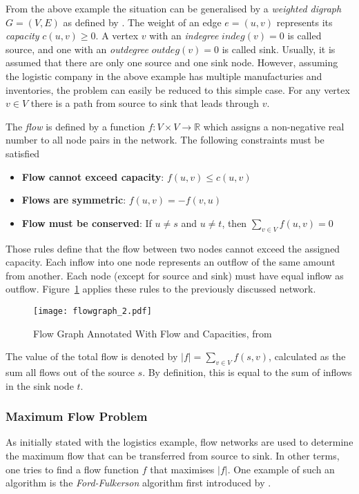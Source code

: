 \documentclass[final]{fhnwreport}       %
\begin{document}
From the above example the situation can be generalised by a \emph{weighted digraph} $G=(V,E)$ as defined by \cite{brossard_graph_2010}. The weight of an edge $e=(u,v)$ represents its \emph{capacity} $c(u,v)\geq0$. A vertex $v$ with an \emph{indegree} $indeg(v)=0$ is called source, and one with an \emph{outdegree} $outdeg(v)=0$ is called sink. Usually, it is assumed that there are only one source and one sink node. However, assuming the logistic company in the above example has multiple manufacturies and inventories, the problem can easily be reduced to this simple case. For any vertex $v \in V$ there is a path from source to sink that leads through $v$.

The \emph{flow} is defined by a function $f : V \times V \rightarrow \mathbb{R}$ which assigns a non-negative real number to all node pairs in the network. The following constraints must be satisfied
\begin{itemize}
  \item \textbf{Flow cannot exceed capacity}:
  $f(u,v) \leq c(u,v)$
  \item \textbf{Flows are symmetric}:
  $f(u,v) = -f(v,u)$
  \item \textbf{Flow must be conserved}: If $u \neq s$ and $u \neq t$, then $\displaystyle{\sum_{v \in V}f(u,v)}=0$
\end{itemize}

Those rules define that the flow between two nodes cannot exceed the assigned capacity. Each inflow into one node represents an outflow of the same amount from another. Each node (except for source and sink) must have equal inflow as outflow. Figure~\ref{fig:flow_graph_2} applies these rules to the previously discussed network.

\begin{figure}[H]
\centering
\texttt{[image: flowgraph\_2.pdf]}
\caption{Flow Graph Annotated With Flow and Capacities, from \cite{brossard_graph_2010}}
\label{fig:flow_graph_2}
\end{figure}

The value of the total flow is denoted by $|f|=\displaystyle{\sum_{v \in V} f(s,v)}$, calculated as the sum all flows out of the source $s$. By definition, this is equal to the sum of inflows in the sink node $t$.

\subsubsection{Maximum Flow Problem}\label{subsubsec:maxflow}
As initially stated with the logistics example, flow networks are used to determine the maximum flow that can be transferred from source to sink. In other terms, one tries to find a flow function $f$ that maximises $|f|$. One example of such an algorithm is the \emph{Ford-Fulkerson} algorithm first introduced by \textcite{ford_maximal_1956}.
\end{document}
